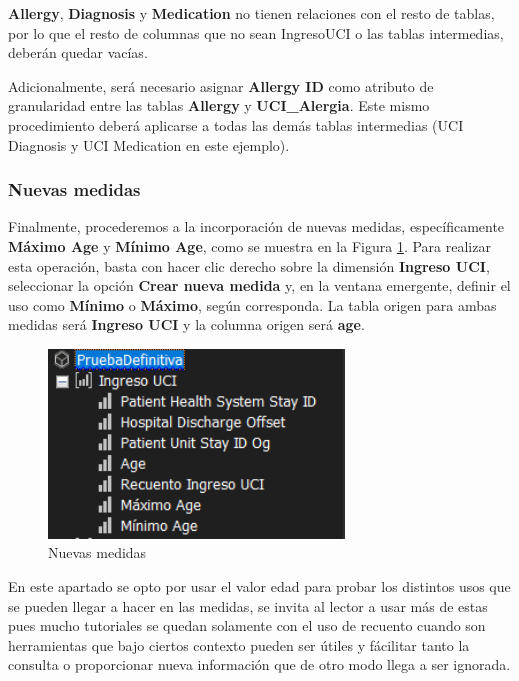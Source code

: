 \documentclass[12pt, a4paper, twoside]{article}
\begin{document}
\textbf{Allergy}, \textbf{Diagnosis} y \textbf{Medication} no tienen relaciones con el resto de tablas, por lo que el resto de columnas que no sean IngresoUCI o las tablas intermedias, deberán quedar vacías.

Adicionalmente, será necesario asignar \textbf{Allergy ID} como atributo de granularidad entre las tablas \textbf{Allergy} y \textbf{UCI\_Alergia}. Este mismo procedimiento deberá aplicarse a todas las demás tablas intermedias (UCI Diagnosis y UCI Medication en este ejemplo).

\subsubsection{Nuevas medidas}

Finalmente, procederemos a la incorporación de nuevas medidas, específicamente \textbf{Máximo Age} y \textbf{Mínimo Age}, como se muestra en la Figura \ref{fig:32}. Para realizar esta operación, basta con hacer clic derecho sobre la dimensión \textbf{Ingreso UCI}, seleccionar la opción \textbf{Crear nueva medida} y, en la ventana emergente, definir el uso como \textbf{Mínimo} o \textbf{Máximo}, según corresponda. La tabla origen para ambas medidas será \textbf{Ingreso UCI} y la columna origen será \textbf{age}.

\begin{figure}[H]
	\centering
	\includegraphics[width=0.7\textwidth]{image/medidasNuevas}
	\caption{Nuevas medidas}
	\label{fig:32}
\end{figure}

En este apartado se opto por usar el valor edad para probar los distintos usos que se pueden llegar a hacer en las medidas, se invita al lector a usar más de estas pues mucho tutoriales se quedan solamente con el uso de recuento cuando son herramientas que bajo ciertos contexto pueden ser útiles y fácilitar tanto la consulta o proporcionar nueva información que de otro modo llega a ser ignorada.
\end{document}
